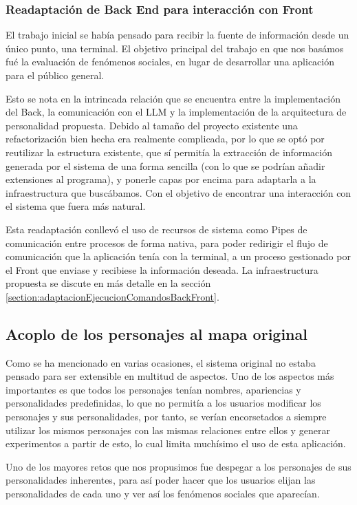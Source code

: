 \subsubsection{Readaptación de Back End para interacción con Front}

El trabajo inicial se había pensado para recibir la fuente de información desde un único punto, una terminal. El objetivo principal del trabajo en que nos basámos fué la evaluación de fenómenos sociales, en lugar de desarrollar una aplicación para el público general.

Esto se nota en la intrincada relación que se encuentra entre la implementación del Back, la comunicación con el LLM y la implementación de la arquitectura de personalidad propuesta. Debido al tamaño del proyecto existente una refactorización bien hecha era realmente complicada, por lo que se optó por reutilizar la estructura existente, que sí permitía la extracción de información generada por el sistema de una forma sencilla (con lo que se podrían añadir extensiones al programa), y ponerle capas por encima para adaptarla a la infraestructura que buscábamos. Con el objetivo de encontrar una interacción con el sistema que fuera más natural.

Esta readaptación conllevó el uso de recursos de sistema como Pipes de comunicación entre procesos de forma nativa, para poder redirigir el flujo de comunicación que la aplicación tenía con la terminal, a un proceso gestionado por el Front que enviase y recibiese la información deseada. La infraestructura propuesta se discute en más detalle en la sección \ref{section:adaptacionEjecucionComandosBackFront}.

\subsection{Acoplo de los personajes al mapa original}
\label{problemaPersonajes}
Como se ha mencionado en varias ocasiones, el sistema original no estaba pensado para ser extensible en multitud de aspectos. Uno de los aspectos más importantes es que todos los personajes tenían nombres, apariencias y personalidades predefinidas, lo que no permitía a los usuarios modificar los personajes y sus personalidades, por tanto, se verían encorsetados a siempre utilizar los mismos personajes con las mismas relaciones entre ellos y generar experimentos a partir de esto, lo cual limita muchísimo el uso de esta aplicación.

Uno de los mayores retos que nos propusimos fue despegar a los personajes de sus personalidades inherentes, para así poder hacer que los usuarios elijan las personalidades de cada uno y ver así los fenómenos sociales que aparecían.


